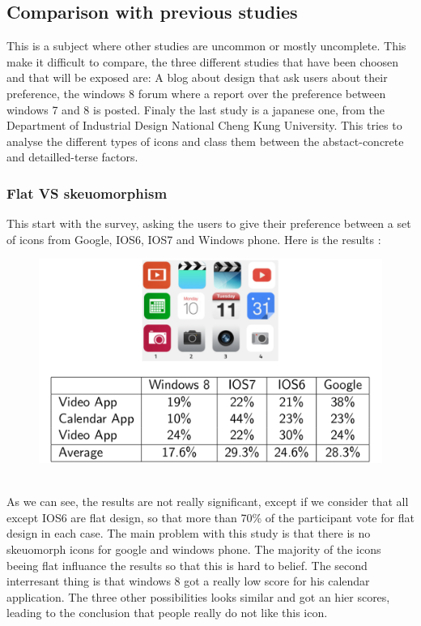 \documentclass[a4paper,11pt] {article}
\theoremstyle{definition}
\begin{document}
    \subsection{Comparison with previous studies}
    This is a subject where other studies are uncommon or mostly uncomplete. This make it difficult to compare, the three different studies that have been choosen and that will be exposed are: A blog about design that ask users about their preference, the windows 8 forum where a report over the preference between windows 7 and 8 is posted. Finaly the last study is a japanese one, from the Department of Industrial Design National Cheng Kung University. This tries to analyse the different types of icons and class them between the abstact-concrete and detailled-terse factors.
    
    \subsubsection{Flat VS skeuomorphism\cite{flatVSskeuomorphisme}}
    This start with the survey, asking the users to give their preference between a set of icons from Google, IOS6, IOS7 and Windows phone. Here is the results :\\
    \begin{figure}[h]
    \centering
    \includegraphics[scale=0.3]{fig-report/flatVSskeuomorphism.png}
    \end{figure}\\
As we can see, the results are not really significant, except if we consider that all except IOS6 are flat design, so that more than 70\% of the participant vote for flat design in each case. The main problem with this study is that there is no skeuomorph icons for google and windows phone. The majority of the icons beeing flat influance the results so that this is hard to belief. The second interresant thing is that windows 8 got a really low score for his calendar application. The three other possibilities looks similar and got an hier scores, leading to the conclusion that people really do not like this icon.
\end{document}
